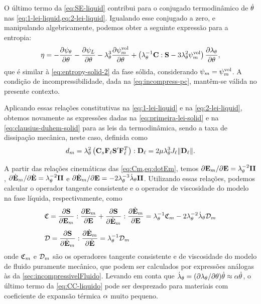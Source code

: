 \documentclass[Tese.tex]{subfiles}
\begin{document}
O último termo da \cref{eq:SE-liquid} contribui para o conjugado termodinâmico de $\dot{\theta}$ nas \cref{eq:1-lei-liquid,eq:2-lei-liquid}. Igualando esse conjugado a zero, e manipulando algebricamente, podemos obter a seguinte expressão para a entropia:
\begin{equation}
\eta = - \dfrac{\partial\psi_{\theta}}{\partial\theta} - \dfrac{\partial\psi_L}{\partial\theta} - \lambda_{\theta}^3\dfrac{\partial\psi_m^\text{vol}}{\partial\theta} +  \left(\lambda_{\theta}^{-1}\mathbf{C}:\mathbf{S} - 3\lambda_{\theta}^2\psi_m^\text{vol}\right)\dfrac{\partial\lambda_{\theta}}{\partial\theta}, \label{eq:entropy-liquid}
\end{equation}
que é similar à \cref{eq:entropy-solid-2} da fase sólida, considerando $\psi_m = \psi_m^\text{vol}$. A condição de incompressibilidade, dada na \cref{eq:incompress-pc}, mantêm-se válida no presente contexto.

Aplicando essas relações constitutivas na \cref{eq:1-lei-liquid} e na \cref{eq:2-lei-liquid}, obtemos novamente as expressões dadas na \cref{eq:primeira-lei-solid} e na \cref{eq:clausius-duhem-solid} para as leis da termodinâmica, sendo a taxa de dissipação mecânica, neste caso, definida como
\begin{equation} \label{eq:dissipation-liquid}
d_{m} = \lambda_{\theta}^2\left(\mathbf{C}_s\mathbf{F}_\ell\mathbf{S}'\mathbf{F}_\ell^T\right):\mathbf{D}_\ell = 2\mu\lambda_{\theta}^3J_\ell\|\mathbf{D}_\ell\|.
\end{equation}

A partir das relações cinemáticas das \cref{eq:Cm,eq:dotEm}, temos ${\partial\mathbf{E}_m}/{\partial\mathbf{E}} = \lambda_{\theta}^{-2}\mathbf{II}$, ${\partial\dot{\mathbf{E}}_m}/{\partial\dot{\mathbf{E}}} = \lambda_{\theta}^{-2}\mathbf{II}$ e ${\partial\dot{\mathbf{E}}_m}/{\partial\mathbf{E}} = -2\lambda_{\theta}^{-3}\dot{\lambda}_{\theta}\mathbf{II}$. Utilizando essas relações, podemos calcular o operador tangente consistente e o operador de viscosidade do modelo na fase líquida, respectivamente, como
\begin{align}
&\mathfrak{C} = \dfrac{\partial\mathbf{S}}{\partial\mathbf{E}_m}:\dfrac{\partial\mathbf{E}_m}{\partial\mathbf{E}} + \dfrac{\partial\mathbf{S}}{\partial\dot{\mathbf{E}}_m}:\dfrac{\partial\dot{\mathbf{E}}_m}{\partial\mathbf{E}} = \lambda_{\theta}^{-1}\mathfrak{C}_m - 2\lambda_{\theta}^{-2}\dot{\lambda}_{\theta}\mathcal{D}_m \label{eq:CC-liquido} \\[0.1cm]
&\mathcal{D} = \dfrac{\partial\mathbf{S}}{\partial\dot{\mathbf{E}}_m}:\dfrac{\partial\dot{\mathbf{E}}_m}{\partial\dot{\mathbf{E}}} = \lambda_{\theta}^{-1}\mathcal{D}_m \label{eq:viscop-liquido}
\end{align}
onde $\mathfrak{C}_m$ e $\mathcal{D}_m$ são os operadores tangente consistente e de viscosidade do modelo de fluido puramente mecânico, que podem ser calculados por expressões análogas às da \cref{sec:incompressivelFluido}. Levando em conta que $\dot{\lambda}_{\theta} = (\partial\lambda_{\theta}/\partial\theta)\dot{\theta} \approx \alpha\dot{\theta}$, o último termo da \cref{eq:CC-liquido} pode ser desprezado para materiais com coeficiente de expansão térmica $\alpha$ muito pequeno.
\end{document}
